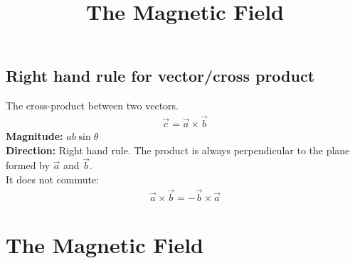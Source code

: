 \documentclass[aspectratio=169,
hyperref={colorlinks,urlcolor=blue}
]{beamer}
\begin{document}
\subsection{Right hand rule for vector/cross product}
\label{subsec:righthandruleforvector/cross product}
{
The cross-product between two vectors. 
\begin{align*}%
\vec c = \vec a \times \vec b
\end{align*}%
\textbf{Magnitude:} $ab\sin\theta$\\
\textbf{Direction:} Right hand rule. The product is always perpendicular to the plane formed by $\vec a$ and $\vec b$. \\
It does not commute:
\begin{align*}
\vec a \times \vec b = -\vec b \times \vec a
\end{align*}
}
{
\vspace{-1cm}

}










\section{The Magnetic Field}
\label{sec:themagneticfield}
\title{The Magnetic Field}


\begin{frame}
\titlepage
\thispagestyle{empty}
\end{frame}





\end{document}
